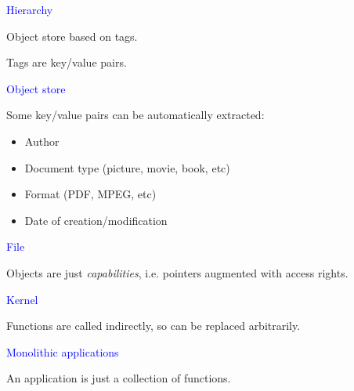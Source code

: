 \documentclass{slides}
\newcommand{\ti}[1]{\begin{center}\Large{\textcolor{blue}{#1}}\end{center}}
\begin{document}
\begin{slide}\ti{Hierarchy}

Object store based on tags.

Tags are key/value pairs.

\vfill\end{slide}
\begin{slide}\ti{Object store}

Some key/value pairs can be automatically extracted:

\begin{itemize}
\item Author
\item Document type (picture, movie, book, etc)
\item Format (PDF, MPEG, etc)
\item Date of creation/modification
\end{itemize}

\vfill\end{slide}
\begin{slide}\ti{File}

Objects are just \emph{capabilities}, i.e. pointers augmented with
access rights.

\vfill\end{slide}
\begin{slide}\ti{Kernel}

Functions are called indirectly, so can be replaced arbitrarily.

\vfill\end{slide}
\begin{slide}\ti{Monolithic applications}

An application is just a collection of functions.

\vfill\end{slide}
\begin{slide}\ti{}

\vfill\end{slide}
\begin{slide}\ti{}

\vfill\end{slide}
\end{document}
